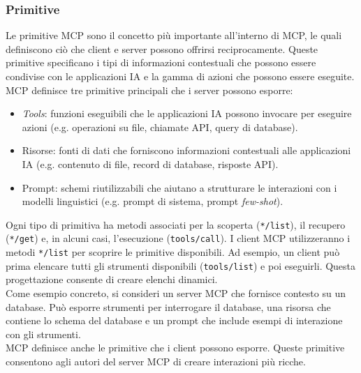 \subsubsection{Primitive}
Le primitive MCP sono il concetto più importante all'interno di MCP, le quali definiscono ciò che client e server possono offrirsi reciprocamente. 
Queste primitive specificano i tipi di informazioni contestuali che possono essere condivise con le applicazioni IA e la gamma di azioni che 
possono essere eseguite. MCP definisce tre primitive principali che i server possono esporre:
\begin{itemize}
\item \textit{Tools}: funzioni eseguibili che le applicazioni IA possono invocare per eseguire azioni (e.g. operazioni su file, chiamate API, query di database).
\item Risorse: fonti di dati che forniscono informazioni contestuali alle applicazioni IA (e.g. contenuto di file, record di database, risposte API).
\item Prompt: schemi riutilizzabili che aiutano a strutturare le interazioni con i modelli linguistici (e.g. prompt di sistema, prompt \textit{few-shot}).
\end{itemize}
Ogni tipo di primitiva ha metodi associati per la scoperta (\texttt{*/list}), il recupero (\texttt{*/get}) e, in alcuni casi, l'esecuzione (\texttt{tools/call}). I client MCP utilizzeranno i metodi \texttt{*/list} per scoprire le primitive disponibili. Ad esempio, un client può prima elencare tutti gli strumenti disponibili (\texttt{tools/list}) e poi eseguirli. Questa progettazione consente di creare elenchi dinamici. \\
Come esempio concreto, si consideri un server MCP che fornisce contesto su un database. Può esporre strumenti per interrogare il database, una risorsa che contiene lo schema del database e un prompt che include esempi di interazione con gli strumenti. \\
MCP definisce anche le primitive che i client possono esporre. Queste primitive consentono agli autori del server MCP di creare interazioni più ricche.
